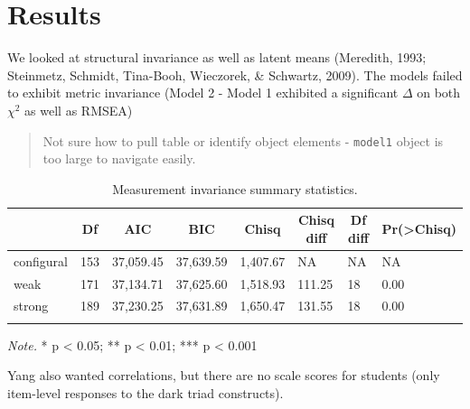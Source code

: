 \documentclass[
  english,
  man]{apa6}
\begin{document}
\hypertarget{results}{%
\section{Results}\label{results}}

We looked at structural invariance as well as latent means (Meredith, 1993; Steinmetz, Schmidt, Tina-Booh, Wieczorek, \& Schwartz, 2009). The models failed to exhibit metric invariance (Model 2 - Model 1 exhibited a significant \(\Delta\) on both \(\chi^2\) as well as RMSEA)

\begin{quote}
Not sure how to pull table or identify object elements - \texttt{model1} object is too large to navigate easily.
\end{quote}

\begin{table}[tbp]

\begin{center}
\begin{threeparttable}

\caption{\label{tab:measinv}Measurement invariance summary statistics.}

\begin{tabular}{llllllll}
\toprule
 & \multicolumn{1}{c}{Df} & \multicolumn{1}{c}{AIC} & \multicolumn{1}{c}{BIC} & \multicolumn{1}{c}{Chisq} & \multicolumn{1}{c}{Chisq diff} & \multicolumn{1}{c}{Df diff} & \multicolumn{1}{c}{Pr(>Chisq)}\\
\midrule
configural & 153 & 37,059.45 & 37,639.59 & 1,407.67 & NA & NA & NA\\
weak & 171 & 37,134.71 & 37,625.60 & 1,518.93 & 111.25 & 18 & 0.00\\
strong & 189 & 37,230.25 & 37,631.89 & 1,650.47 & 131.55 & 18 & 0.00\\
\bottomrule
\addlinespace
\end{tabular}

\begin{tablenotes}[para]
\normalsize{\textit{Note.} * p < 0.05; ** p < 0.01; *** p < 0.001}
\end{tablenotes}

\end{threeparttable}
\end{center}

\end{table}

Yang also wanted correlations, but there are no scale scores for students (only item-level responses to the dark triad constructs).
\end{document}
